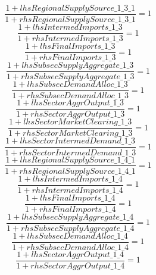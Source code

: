 \begin{dmath}
\frac{1+{lhsRegionalSupplySource\_1\_3\_1}}{1+{rhsRegionalSupplySource\_1\_3\_1}}=1
\end{dmath}
\begin{dmath}
\frac{1+{lhsIntermedImports\_1\_3}}{1+{rhsIntermedImports\_1\_3}}=1
\end{dmath}
\begin{dmath}
\frac{1+{lhsFinalImports\_1\_3}}{1+{rhsFinalImports\_1\_3}}=1
\end{dmath}
\begin{dmath}
\frac{1+{lhsSubsecSupplyAggregate\_1\_3}}{1+{rhsSubsecSupplyAggregate\_1\_3}}=1
\end{dmath}
\begin{dmath}
\frac{1+{lhsSubsecDemandAlloc\_1\_3}}{1+{rhsSubsecDemandAlloc\_1\_3}}=1
\end{dmath}
\begin{dmath}
\frac{1+{lhsSectorAggrOutput\_1\_3}}{1+{rhsSectorAggrOutput\_1\_3}}=1
\end{dmath}
\begin{dmath}
\frac{1+{lhsSectorMarketClearing\_1\_3}}{1+{rhsSectorMarketClearing\_1\_3}}=1
\end{dmath}
\begin{dmath}
\frac{1+{lhsSectorIntermedDemand\_1\_3}}{1+{rhsSectorIntermedDemand\_1\_3}}=1
\end{dmath}
\begin{dmath}
\frac{1+{lhsRegionalSupplySource\_1\_4\_1}}{1+{rhsRegionalSupplySource\_1\_4\_1}}=1
\end{dmath}
\begin{dmath}
\frac{1+{lhsIntermedImports\_1\_4}}{1+{rhsIntermedImports\_1\_4}}=1
\end{dmath}
\begin{dmath}
\frac{1+{lhsFinalImports\_1\_4}}{1+{rhsFinalImports\_1\_4}}=1
\end{dmath}
\begin{dmath}
\frac{1+{lhsSubsecSupplyAggregate\_1\_4}}{1+{rhsSubsecSupplyAggregate\_1\_4}}=1
\end{dmath}
\begin{dmath}
\frac{1+{lhsSubsecDemandAlloc\_1\_4}}{1+{rhsSubsecDemandAlloc\_1\_4}}=1
\end{dmath}
\begin{dmath}
\frac{1+{lhsSectorAggrOutput\_1\_4}}{1+{rhsSectorAggrOutput\_1\_4}}=1
\end{dmath}
